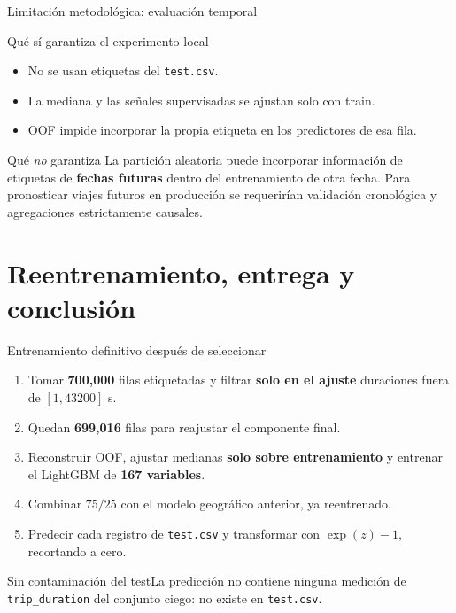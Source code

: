 \documentclass[aspectratio=169,11pt]{beamer}
\begin{document}
\begin{frame}{Limitación metodológica: evaluación temporal}
\small
\begin{block}{Qué sí garantiza el experimento local}
\begin{itemize}
\item No se usan etiquetas del \texttt{test.csv}.
\item La mediana y las señales supervisadas se ajustan solo con train.
\item OOF impide incorporar la propia etiqueta en los predictores de esa fila.
\end{itemize}
\end{block}
\begin{alertblock}{Qué \emph{no} garantiza}
La partición aleatoria puede incorporar información de etiquetas de \textbf{fechas futuras} dentro del entrenamiento de otra fecha. Para pronosticar viajes futuros en producción se requerirían validación cronológica y agregaciones estrictamente causales.
\end{alertblock}
\end{frame}

\section{Reentrenamiento, entrega y conclusión}
\begin{frame}{Entrenamiento definitivo después de seleccionar}
\small
\begin{enumerate}
\item Tomar \textbf{700,000} filas etiquetadas y filtrar \textbf{solo en el ajuste} duraciones fuera de \([1,43200]\) s.
\item Quedan \textbf{699,016} filas para reajustar el componente final.
\item Reconstruir OOF, ajustar medianas \textbf{solo sobre entrenamiento} y entrenar el LightGBM de \textbf{167 variables}.
\item Combinar \(75/25\) con el modelo geográfico anterior, ya reentrenado.
\item Predecir cada registro de \texttt{test.csv} y transformar con \(\exp(z)-1\), recortando a cero.
\end{enumerate}
\begin{block}{Sin contaminación del test}La predicción no contiene ninguna medición de \texttt{trip\_duration} del conjunto ciego: no existe en \texttt{test.csv}.\end{block}
\end{frame}
\end{document}
